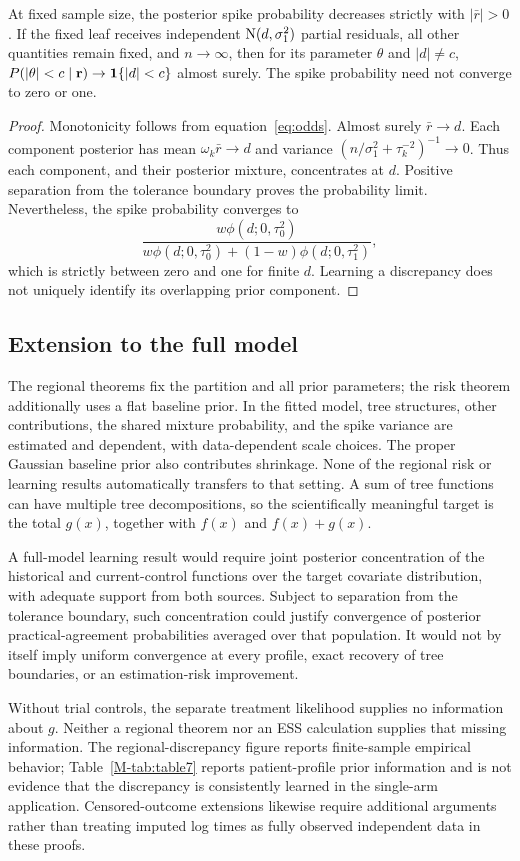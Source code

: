 \begin{lemma}\label{lem:leaf_learning}
At fixed sample size, the posterior spike probability decreases strictly with $|\bar r|>0$. If the fixed leaf receives independent $\mathrm{N}(d,\sigma_1^2)$ partial residuals, all other quantities remain fixed, and $n\to\infty$, then for its parameter $\theta$ and $|d|\ne c$,
$P(|\theta|<c\mid\mathbf r)\to\mathbf{1}\{|d|<c\}$ almost surely. The spike probability need not converge to zero or one.
\end{lemma}
\begin{proof}
Monotonicity follows from equation~\eqref{eq:odds}. Almost surely $\bar r\to d$. Each component posterior has mean $\omega_k\bar r\to d$ and variance $(n/\sigma_1^2+\tau_k^{-2})^{-1}\to0$. Thus each component, and their posterior mixture, concentrates at $d$. Positive separation from the tolerance boundary proves the probability limit. Nevertheless, the spike probability converges to
\[
\frac{w\phi(d;0,\tau_0^2)}{w\phi(d;0,\tau_0^2)+(1-w)\phi(d;0,\tau_1^2)},
\]
which is strictly between zero and one for finite $d$. Learning a discrepancy does not uniquely identify its overlapping prior component.
\end{proof}

\subsection{Extension to the full model}\label{sec:C.6}
The regional theorems fix the partition and all prior parameters; the risk theorem additionally uses a flat baseline prior. In the fitted model, tree structures, other contributions, the shared mixture probability, and the spike variance are estimated and dependent, with data-dependent scale choices. The proper Gaussian baseline prior also contributes shrinkage. None of the regional risk or learning results automatically transfers to that setting. A sum of tree functions can have multiple tree decompositions, so the scientifically meaningful target is the total $g(x)$, together with $f(x)$ and $f(x)+g(x)$.

A full-model learning result would require joint posterior concentration of the historical and current-control functions over the target covariate distribution, with adequate support from both sources. Subject to separation from the tolerance boundary, such concentration could justify convergence of posterior practical-agreement probabilities averaged over that population. It would not by itself imply uniform convergence at every profile, exact recovery of tree boundaries, or an estimation-risk improvement.

Without trial controls, the separate treatment likelihood supplies no information about $g$. Neither a regional theorem nor an ESS calculation supplies that missing information. The regional-discrepancy figure reports finite-sample empirical behavior; Table~\ref{M-tab:table7} reports patient-profile prior information and is not evidence that the discrepancy is consistently learned in the single-arm application. Censored-outcome extensions likewise require additional arguments rather than treating imputed log times as fully observed independent data in these proofs.
